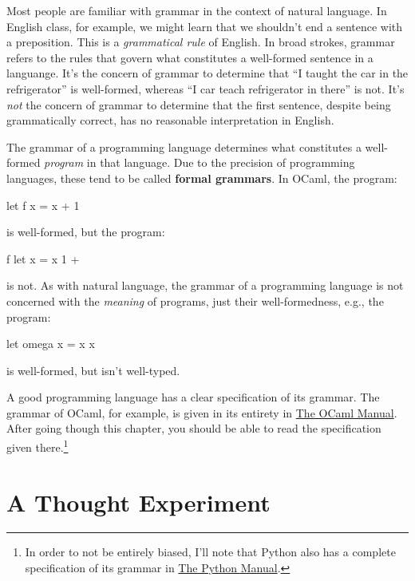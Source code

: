 Most people are familiar with grammar in the context of natural language.
In English class, for example, we might learn that we shouldn't end a sentence with a preposition.
This is a \textit{grammatical rule} of English.
In broad strokes, grammar refers to the rules that govern what constitutes a well-formed sentence in a languange.
It's the concern of grammar to determine that \enquote{I taught the car in the refrigerator} is well-formed, whereas \enquote{I car teach refrigerator in there} is not.
It's \textit{not} the concern of grammar to determine that the first sentence, despite being grammatically correct, has no reasonable interpretation in English.

The grammar of a programming language determines what constitutes a well-formed \textit{program} in that language.
Due to the precision of programming languages, these tend to be called \textbf{formal grammars}.
In OCaml, the program:
%
\begin{ocaml}
  let f x = x + 1
\end{ocaml}
%
is well-formed, but the program:
%
\begin{ocaml}
  f let x = x 1 +
\end{ocaml}
%
is not.
As with natural language, the grammar of a programming language is not concerned with the \textit{meaning} of programs, just their well-formedness, e.g., the program:
%
\begin{ocaml}
  let omega x = x x
\end{ocaml}
%
is well-formed, but isn't well-typed.

A good programming language has a clear specification of its grammar.
The grammar of OCaml, for example, is given in its entirety in \href{https://ocaml.org/manual/5.3/expr.html}{The OCaml Manual}.
After going though this chapter, you should be able to read the specification given there.\footnote{
In order to not be entirely biased, I'll note that Python also has a complete specification of its grammar in \href{https://docs.python.org/3/reference/grammar.html}{The Python Manual}.}

\section{A Thought Experiment}

